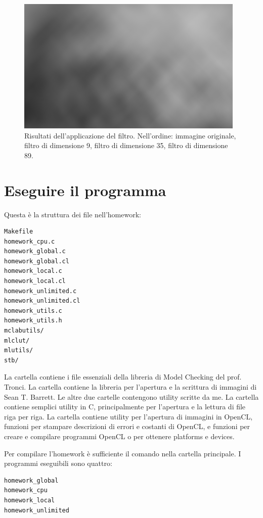 \documentclass[10pt]{myarticle}
\begin{document}
\begin{figure}[tbh]
	\includegraphics[width=\columnwidth]{images/result-example-89.png}
	\caption{Risultati dell'applicazione del filtro. Nell'ordine: immagine originale, filtro di dimensione 9, filtro di dimensione 35, filtro di dimensione 89.}
	\label{fig:applicazione_filtro}
\end{figure}

\section{Eseguire il programma}

Questa \`e la struttura dei file nell'homework:
\begin{verbatim}
Makefile
homework_cpu.c
homework_global.c
homework_global.cl
homework_local.c
homework_local.cl
homework_unlimited.c
homework_unlimited.cl
homework_utils.c
homework_utils.h
mclabutils/
mlclut/
mlutils/
stb/
\end{verbatim}

La cartella  contiene i file essenziali della libreria di Model Checking del prof. Tronci.
La cartella  contiene la libreria per l'apertura e la scrittura di immagini di Sean T. Barrett.
Le altre due cartelle contengono utility scritte da me.
La cartella  contiene semplici utility in C, principalmente per l'apertura e la lettura di file riga per riga.
La cartella  contiene utility per l'apertura di immagini in OpenCL, funzioni per stampare descrizioni di errori e costanti di OpenCL, e funzioni per creare e compilare programmi OpenCL o per ottenere platforms e devices.

Per compilare l'homework \`e sufficiente il comando  nella cartella principale.
I programmi eseguibili sono quattro:
\begin{verbatim}
homework_global
homework_cpu
homework_local
homework_unlimited
\end{verbatim}
\end{document}
